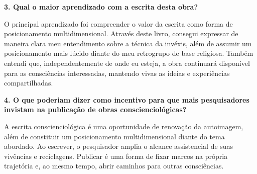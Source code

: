 \documentclass{gescons}
\begin{document}
\begin{multicols}{2}
\textbf{3. Qual o maior aprendizado com a escrita desta obra?}

O principal aprendizado foi compreender o valor da escrita como forma de posicionamento multidimensional. Através deste livro, consegui expressar de maneira clara meu entendimento sobre a técnica da invéxis, além de assumir um posicionamento mais lúcido diante do meu retrogrupo de base religiosa. Também entendi que, independentemente de onde eu esteja, a obra continuará disponível para as consciências interessadas, mantendo vivas as ideias e experiências compartilhadas.

\textbf{4. O que poderiam dizer como incentivo para que mais pesquisadores invistam na publicação de obras conscienciológicas?}

A escrita conscienciológica é uma oportunidade de renovação da autoimagem, além de constituir um posicionamento multidimensional diante do tema abordado. Ao escrever, o pesquisador amplia o alcance assistencial de suas vivências e reciclagens. Publicar é uma forma de fixar marcos na própria trajetória e, ao mesmo tempo, abrir caminhos para outras consciências.
    
    
    \end{multicols}
\end{document}
